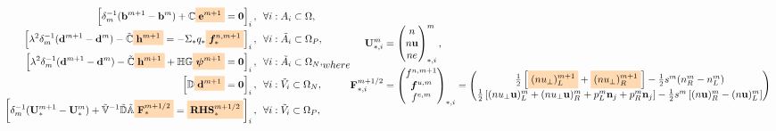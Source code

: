 \documentclass{article}
\newcommand{\mycolorbox}[2]{\colorbox{#1}{$\displaystyle#2$}}
\begin{document}
\begin{subequations}
\begin{align}
    \left[\delta_m^{-1} (\mathbf{b}^{m+1} - \mathbf{b}^{m}) + \mathbb{C}\mycolorbox{orange!30}{\mathbf{e}^{m+1}} = \mathbf{0} \right]_i,\ \ &\forall i:A_i \subset \Omega, \label{equ:maxwell_faraday_ap}\\
    \left[\lambda^2\delta_m^{-1}(\mathbf{d}^{m+1} - \mathbf{d}^m)- \Tilde{\mathbb{C}}\mycolorbox{orange!30}{\mathbf{h}^{m+1}} = - \Sigma_\ast q_\ast \mycolorbox{orange!30}{\bm{f}^{n,m+1}_{\ast}}\right]_i,\ \ &\forall i:\Tilde{A}_i\subset\Omega_P, \label{equ:maxwell_ampere_plasma_ap}\\
    \left[\lambda^2\delta_m^{-1}(\mathbf{d}^{m+1} - \mathbf{d}^m)- \Tilde{\mathbb{C}}\mycolorbox{orange!30}{\mathbf{h}^{m+1}} + \mathbb{H}\mathbb{G}\mycolorbox{orange!30}{\bm{\psi}^{m+1}} = \mathbf{0} \right]_i,\ \ &\forall i:\Tilde{A}_i\subset\Omega_N, \label{equ:maxwell_ampere_nonconducting_ap}\\
    \left[\mathbb{D}\mycolorbox{orange!30}{\mathbf{d}^{m+1}} = \mathbf{0}\right]_i, \ \ &\forall i : \Tilde{V}_i \subset \Omega_N, \label{equ:gauss_nonconducting_ap} \\
    \left[\delta_m^{-1}(\mathbf{U}_{*}^{m+1} - \mathbf{U}_{*}^{m}) + \mathbb{\Tilde{V}}^{-1}\mathbb{\Tilde{D}}\mathbb{\Tilde{A}}\mycolorbox{orange!30}{\mathbf{F}_\ast^{m+1/2}} = \mycolorbox{orange!30}{\mathbf{RHS}_\ast^{m+1/2}} \right]_i,\ \ &\forall i : \Tilde{V}_i \subset \Omega_P, \label{equ:euler_ap}
\end{align}
where 
\begin{align}
    \mathbf{U}_{*,i}^{m} &=
    \begin{pmatrix}
    n \\
    n \mathbf{u} \\
    n e
    \end{pmatrix}^m_{\ast,i}, \\
    \mathbf{F}_{*,i}^{m+1/2} &=
    \begin{pmatrix}
    f^{n,m+1} \\
    \bm{f}^{u,m} \\
    f^{e,m}
    \end{pmatrix}_{\ast,i}
    = 
    \begin{pmatrix}
    \frac{1}{2}\left[\mycolorbox{orange!30}{(nu_{\bot})_{L}^{m+1}} + \mycolorbox{orange!30}{(nu_{\bot})_{R}^{m+1}}\right] - \frac{1}{2}s^m(n_{R}^m - n_{L}^m) \\
    \frac{1}{2}\left[(nu_{\bot}\mathbf{u})^m_{L} + (nu_{\bot}\mathbf{u})^m_{R} + p_{L}^m\mathbf{n}_j + p_{R}^m\mathbf{n}_j\right] - \frac{1}{2}s^m\left[(n\mathbf{u})^m_{R} - (n\mathbf{u})^m_{L}\right] \\

\end{pmatrix}
\end{align}
\end{subequations}
\end{document}
